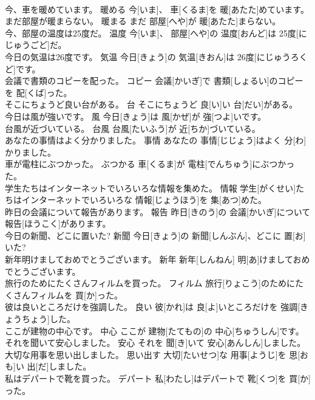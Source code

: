 \documentclass[8pt]{extreport}
\begin{document}
\begin{CJK}{UTF8}{min}
\\	今、車を暖めています。	暖める	今[いま]、 車[くるま]を 暖[あたた]めています。	
\\	まだ部屋が暖まらない。	暖まる	まだ 部屋[へや]が 暖[あたた]まらない。	
\\	今、部屋の温度は25度だ。	温度	今[いま]、 部屋[へや]の 温度[おんど]は 25度[にじゅうごど]だ。	
\\	今日の気温は26度です。	気温	今日[きょう]の 気温[きおん]は 26度[にじゅうろくど]です。	
\\	会議で書類のコピーを配った。	コピー	会議[かいぎ]で 書類[しょるい]のコピーを 配[くば]った。	
\\	そこにちょうど良い台がある。	台	そこにちょうど 良[い]い 台[だい]がある。	
\\	今日は風が強いです。	風	今日[きょう]は 風[かぜ]が 強[つよ]いです。	
\\	台風が近づいている。	台風	台風[たいふう]が 近[ちか]づいている。	
\\	あなたの事情はよく分かりました。	事情	あなたの 事情[じじょう]はよく 分[わ]かりました。	
\\	車が電柱にぶつかった。	ぶつかる	車[くるま]が 電柱[でんちゅう]にぶつかった。	
\\	学生たちはインターネットでいろいろな情報を集めた。	情報	学生[がくせい]たちはインターネットでいろいろな 情報[じょうほう]を 集[あつ]めた。	
\\	昨日の会議について報告があります。	報告	昨日[きのう]の 会議[かいぎ]について 報告[ほうこく]があります。	
\\	今日の新聞、どこに置いた?	新聞	今日[きょう]の 新聞[しんぶん]、どこに 置[お]いた?	
\\	新年明けましておめでとうございます。	新年	新年[しんねん] 明[あ]けましておめでとうございます。	
\\	旅行のためにたくさんフィルムを買った。	フィルム	旅行[りょこう]のためにたくさんフィルムを 買[か]った。	
\\	彼は良いところだけを強調した。	良い	彼[かれ]は 良[よ]いところだけを 強調[きょうちょう]した。	
\\	ここが建物の中心です。	中心	ここが 建物[たてもの]の 中心[ちゅうしん]です。	
\\	それを聞いて安心しました。	安心	それを 聞[き]いて 安心[あんしん]しました。	
\\	大切な用事を思い出しました。	思い出す	大切[たいせつ]な 用事[ようじ]を 思[おも]い 出[だ]しました。	
\\	私はデパートで靴を買った。	デパート	私[わたし]はデパートで 靴[くつ]を 買[か]った。	

\end{CJK}
\end{document}
